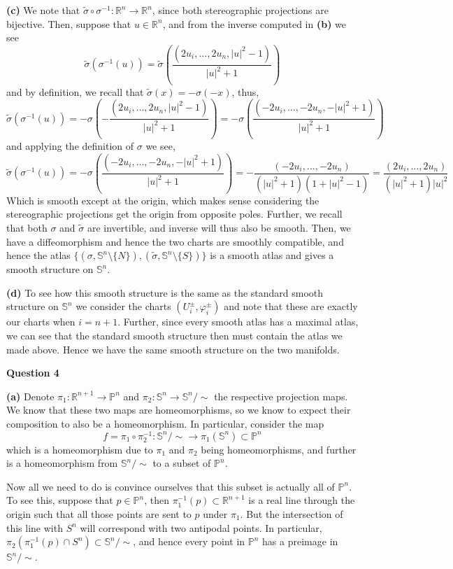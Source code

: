 \documentclass[10pt]{article}
\newcommand{\R}{\mathbb{R}}
\newcommand{\Sp}{\mathbb{S}}
\newcommand{\Pro}{\mathbb{P}}
\begin{document}
\textbf{(c)} We note that $\tilde{\sigma} \circ \sigma^{-1}: \R^{n} \to \R^{n}$, since both stereographic projections are bijective. Then, suppose that $u\in\R^{n}$, and from the inverse computed in \textbf{(b)} we see
$$\tilde{\sigma}(\sigma^{-1}(u)) = \tilde{\sigma}\left(\frac{(2u_{i},\dots,2u_{n},|u|^{2}-1)}{|u|^{2} + 1}\right)$$
and by definition, we recall that $\tilde{\sigma}(x) = -\sigma(-x)$, thus,
$$\tilde{\sigma}(\sigma^{-1}(u)) = -\sigma\left(-\frac{(2u_{i},\dots,2u_{n},|u|^{2}-1)}{|u|^{2} + 1}\right) = -\sigma\left(\frac{(-2u_{i},\dots,-2u_{n},-|u|^{2}+1)}{|u|^{2} + 1}\right)$$
and applying the definition of $\sigma$ we see,
$$\tilde{\sigma}(\sigma^{-1}(u)) = -\sigma\left(\frac{(-2u_{i},\dots,-2u_{n},-|u|^{2}+1)}{|u|^{2} + 1}\right) = -\frac{(-2u_{i},\dots,-2u_{n})}{(|u|^{2} + 1)(1 + |u|^{2} - 1)} = \frac{(2u_{i},\dots,2u_{n})}{(|u|^{2} + 1)|u|^{2}}$$
Which is smooth except at the origin, which makes sense considering the stereographic projections get the origin from opposite poles. Further, we recall that both $\sigma$ and $\tilde{\sigma}$ are invertible, and inverse will thus also be smooth. Then, we have a diffeomorphism and hence the two charts are smoothly compatible, and hence the atlas $\{(\sigma,\Sp^{n}\setminus \{N\}),(\tilde{\sigma},\Sp^{n}\setminus \{S\})\}$ is a smooth atlas and gives a smooth structure on $\Sp^{n}$.

\textbf{(d)} To see how this smooth structure is the same as the standard smooth structure on $\Sp^{n}$ we consider the charts $(U_{i}^{\pm},\varphi_{i}^{\pm})$ and note that these are exactly our charts when $i = n+1$. Further, since every smooth atlas has a maximal atlas, we can see that the standard smooth structure then must contain the atlas we made above. Hence we have the same smooth structure on the two manifolds.

\newpage

\textbf{Question 4}

\textbf{(a)} Denote $\pi_{1} : \R^{n+1} \to \Pro^{n}$ and $\pi_{2} : \Sp^{n} \to \Sp^{n}/\sim$ the respective projection maps. We know that these two maps are homeomorphisms, so we know to expect their composition to also be a homeomorphism. In particular, consider the map
$$f = \pi_{1} \circ\pi_{2}^{-1}: \Sp^{n}/\sim \to \pi_{1}(\Sp^{n})\subset \Pro^{n}$$
which is a homeomorphism due to $\pi_{1}$ and $\pi_{2}$ being homeomorphisms, and further is a homeomorphism from $\Sp^{n}/\sim$ to a subset of $\Pro^{n}$.

Now all we need to do is convince ourselves that this subset is actually all of $\Pro^{n}$. To see this, suppose that $p\in \Pro^{n}$, then $\pi_{1}^{-1}(p) \subset \R^{n+1}$ is a real line through the origin such that all those points are sent to $p$ under $\pi_{1}$. But the intersection of this line with $S^{n}$ will correspond with two antipodal points. In particular, $\pi_{2}\left(\pi_{1}^{-1}(p)\cap S^{n}\right)\subset \Sp^{n}/\sim$, and hence every point in $\Pro^{n}$ has a preimage in $\Sp^{n}/\sim$.
\end{document}
